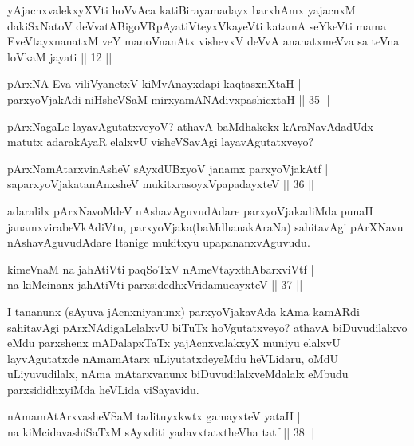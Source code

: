 \begin{shl}
yAjacnxvalekxyXVti hoVvAca katiBirayamadayx barxhAmx yajacnxM dakiSxNatoV deVvatABigoVRpAyatiVteyxVkayeVti katamA seYkeVti mama EveVtayxnanatxM veY manoV\s nanAtx vishevxV deVvA ananatxmeVva sa teVna loVkaM jayati || 12 ||
\end{shl}


\begin{shl}
pArxNA Eva viliVyanetxV kiMvA\s nayxdapi kaqtasxnXtaH |\\
parxyoVjakAdi niHsheVSaM mirxyamANAdivxpashicxtaH \hfill || 35 ||
\end{shl}

\begin{artha}
pArxNagaLe layavAgutatxveyoV? athavA baMdhakekx kAraNavAdadUdx matutx adarakAyaR elalxvU 
visheVSavAgi layavAgutatxveyo?
\end{artha}

\begin{shl}
pArxNamAtarxvinAsheV sAyxdUBxyoV janamx parxyoVjakAtf |\\
saparxyoVjakatanAnxsheV mukitxrasoyxVpapadayxteV \hfill || 36 ||
\end{shl}

\begin{artha}
adaralilx pArxNavoMdeV nAshavAguvudAdare parxyoVjakadiMda punaH janamxvirabeVkAdiVtu, parxyoVjaka(baMdhanakAraNa) sahitavAgi pArXNavu nAshavAguvudAdare Itanige mukitxyu upapananxvAguvudu.
\end{artha}

\begin{shl}
kimeVnaM na ja{\null}hAtiVti paqSoTxV nAmeVtayxthAbarxviVtf |\\
na kiMcinanx ja{\null}hAtiVti parxsidedhxVridamucayxteV \hfill || 37 ||
\end{shl}

\begin{artha}
I tananunx (sAyuva jAcnxniyanunx) parxyoVjakavAda kAma kamARdi sahitavAgi pArxNAdigaLelalxvU biTuTx hoVgutatxveyo? athavA biDuvudilalxvo eMdu parxshenx mADalapxTaTx yajAcnxvalakxyX muniyu elalxvU layvAgutatxde nAmamAtarx uLiyutatxdeyeMdu heVLidaru, oMdU uLiyuvudilalx, nAma mAtarxvanunx biDuvudilalxveMdalalx eMbudu parxsididhxyiMda heVLida viSayavidu.
\end{artha}

\begin{shl}
nAmamAtArxvasheVSaM tadituyxkwtx gamayxteV yataH |\\
na kiMcidavashiSaTxM sAyxditi yadavxtatxtheVha tatf \hfill || 38 ||
\end{shl}

